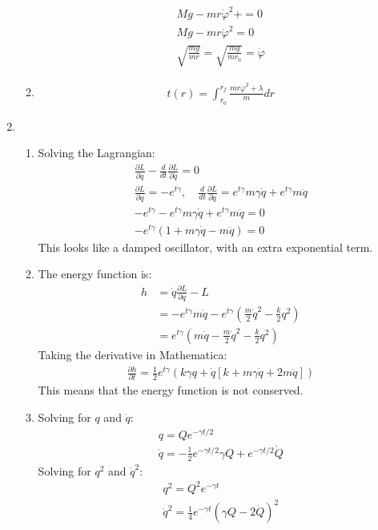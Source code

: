 \documentclass[12pt]{article}
\newcommand{\p}[2]{\frac{\partial #1}{\partial #2}}
\newcommand{\der}[2]{\frac{d #1}{d #2}}
\newcommand{\Lag}[3]{
  \p{L}{#1}-\der{}{t}\p{L}{\dot{#1}}=0\\
  \p{L}{#1}=#2,\quad \der{}{t}\p{L}{\dot{#1}}=#3\\
  #2-#3=0
}
\begin{document}
\begin{enumerate}
\begin{enumerate}
\begin{gather*}
        Mg-mr\dot{\varphi}^2+=0\\
        Mg-mr\dot{\varphi}^2=0\\
        \sqrt{\frac{mg}{mr}}=\sqrt{\frac{mg}{mr_0}}=\dot{\varphi}
      \end{gather*}
      \item
      \begin{gather*}
        t(r)=\int_{r_0}^{r_f}\frac{mr\dot{\varphi}^2+\lambda}{m}dr
      \end{gather*}
    \end{enumerate}
    \item
    \begin{enumerate}
      \item Solving the Lagrangian:
      \begin{gather*}
        \Lag{q}{-e^{t\gamma}}{e^{t\gamma}m\gamma\dot{q}+e^{t\gamma}m\ddot{q}}\\
        -e^{t\gamma}\left(1+m\gamma\dot{q}-m\ddot{q} \right)=0
      \end{gather*}
      This looks like a damped oscillator, with an extra exponential term.
      \item The energy function is:
      \begin{align*}
        h&=\dot{q}\p{L}{\dot{q}}-L\\
        &=-e^{t\gamma}m\dot{q}-e^{t\gamma}\left( \frac{m}{2}\dot{q}^2-\frac{k}{2}q^2 \right)\\
        &=e^{t\gamma}\left(m\dot{q}-\frac{m}{2}\dot{q}^2-\frac{k}{2}q^2\right)
      \end{align*}
      Taking the derivative in Mathematica:
      \begin{gather*}
        \p{h}{t}=\frac{1}{2}e^{t\gamma}\left( k\gamma q+\dot{q}\left[ k+m\gamma\dot{q}+2m\ddot{q} \right] \right)
      \end{gather*}
      This means that the energy function is not conserved.
      \item Solving for $q$ and $\dot{q}$:
      \begin{gather*}
        q=Qe^{-\gamma t/2}\\
        \dot{q}=-\frac{1}{2}e^{-\gamma t/2}\gamma Q+e^{-\gamma t/2}\dot{Q}
      \end{gather*}
      Solving for $q^2$ and $\dot{q}^2$:
      \begin{gather*}
        q^2=Q^2 e^{-\gamma t}\\
        \dot{q}^2=\frac{1}{4}e^{-\gamma t}\left( \gamma Q-2\dot{Q} \right)^2
      \end{gather*}

\end{enumerate}
\end{enumerate}
\end{document}
